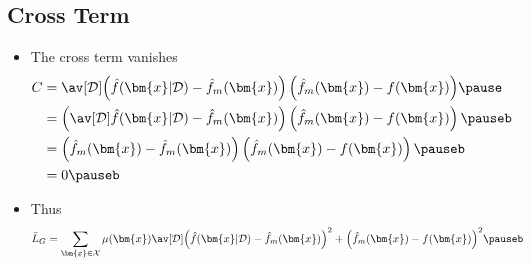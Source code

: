 \begin{slide}
\section{Cross Term}

\begin{PauseHighLight}
  \begin{itemize}
  \item The cross term vanishes
  \begin{align*}
  C &= \av[\mathcal{D}]{ \left(\hat{f}(\bm{x}\vert \mathcal{D}) -
              \hat{f}_m(\bm{x}) \right)\left(
              \hat{f}_m(\bm{x}) - f(\bm{x}) \right) }\pause\\
     &= \left(\av[\mathcal{D}]{\hat{f}(\bm{x}\vert \mathcal{D})} -
              \hat{f}_m(\bm{x}) \right)\left(
              \hat{f}_m(\bm{x}) - f(\bm{x}) \right)\pauseb\\
     &= \left(\hat{f}_m(\bm{x}) -
              \hat{f}_m(\bm{x}) \right)\left(
              \hat{f}_m(\bm{x}) - f(\bm{x}) \right)\pauseb\\
              &= 0\pauseb
  \end{align*}
  \item Thus
  \begin{align*}
   \bar{L}_G &= \sum_{\bm{x}\in\mathcal{X}} \mu(\bm{x})
              \av[\mathcal{D}]{ 
              \left(\hat{f}(\bm{x}\vert \mathcal{D}) -
              \hat{f}_m(\bm{x}) \right)^2 + \left(
              \hat{f}_m(\bm{x}) - f(\bm{x}) \right)^2 }\pauseb
  \end{align*}
  \end{itemize}
\end{PauseHighLight}

\end{slide}




